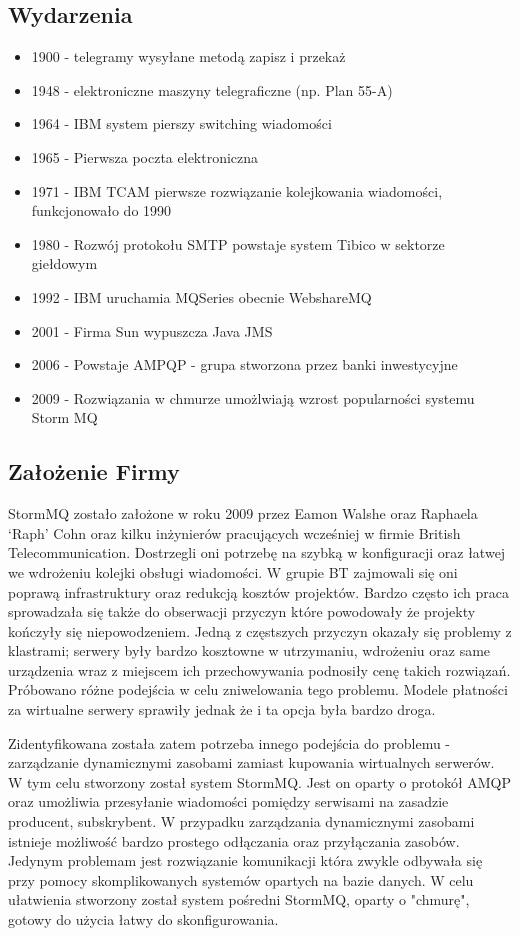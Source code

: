 \documentclass[paper=a4, fontsize=11pt]{scrartcl} %
\numberwithin{equation}{section} %
\numberwithin{figure}{section} %
\numberwithin{table}{section} %
\begin{document}
\subsection{Wydarzenia}

\begin{itemize}
    \item 1900 - telegramy wysyłane metodą zapisz i przekaż
    \item 1948 - elektroniczne maszyny telegraficzne (np. Plan 55-A)
    \item 1964 - IBM system pierszy switching wiadomości
    \item 1965 - Pierwsza poczta elektroniczna
    \item 1971 - IBM TCAM pierwsze rozwiązanie kolejkowania wiadomości, funkcjonowało do 1990
    \item 1980 - Rozwój protokołu SMTP powstaje system Tibico w sektorze giełdowym
    \item 1992 - IBM uruchamia MQSeries obecnie WebshareMQ
    \item 2001 - Firma Sun wypuszcza Java JMS 
    \item 2006 - Powstaje AMPQP - grupa stworzona przez banki inwestycyjne
    \item 2009 - Rozwiązania w chmurze umożlwiają wzrost popularności systemu Storm MQ
\end{itemize}

\subsection{Założenie Firmy}

StormMQ zostało założone w roku 2009 przez Eamon Walshe oraz Raphaela ‘Raph’ Cohn oraz kilku inżynierów
pracujących wcześniej w firmie British Telecommunication.
Dostrzegli oni potrzebę na szybką w konfiguracji oraz łatwej we wdrożeniu kolejki obsługi
wiadomości. W grupie BT zajmowali się oni poprawą infrastruktury oraz redukcją kosztów projektów.
Bardzo często ich praca sprowadzała się także do obserwacji przyczyn które powodowały że projekty kończyły się
niepowodzeniem. Jedną z częstszych przyczyn okazały się problemy z klastrami; serwery były bardzo kosztowne w utrzymaniu,
wdrożeniu oraz same urządzenia wraz z miejscem ich przechowywania podnosiły cenę takich rozwiązań.
Próbowano różne podejścia w celu zniwelowania tego problemu. Modele płatności za wirtualne serwery sprawiły jednak
że i ta opcja była bardzo droga. 

Zidentyfikowana została zatem potrzeba innego podejścia do problemu - zarządzanie dynamicznymi zasobami zamiast kupowania
wirtualnych serwerów. W tym celu stworzony został system StormMQ. Jest on oparty o protokół AMQP oraz
umożliwia przesyłanie wiadomości pomiędzy serwisami na zasadzie producent, subskrybent.
W przypadku zarządzania dynamicznymi zasobami istnieje możliwość bardzo prostego odłączania oraz przyłączania zasobów.
Jedynym problemam jest rozwiązanie komunikacji która zwykle odbywała się przy pomocy skomplikowanych systemów opartych
na bazie danych. W celu ułatwienia stworzony został system pośredni StormMQ, oparty o "chmurę", gotowy do użycia 
łatwy do skonfigurowania.
\end{document}
